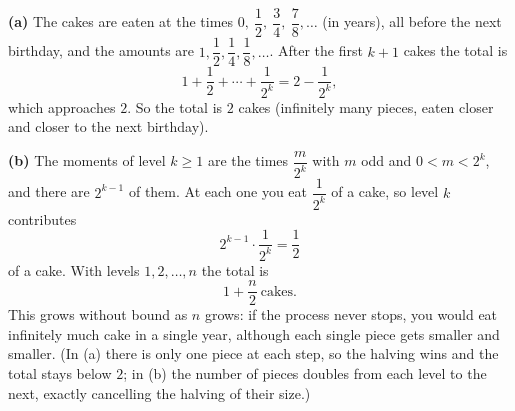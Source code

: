 \textbf{(a)} The cakes are eaten at the times $0,\ \dfrac{1}{2},\ \dfrac{3}{4},\ \dfrac{7}{8},\ldots$ (in years), all before the next birthday, and the amounts are $1,\dfrac{1}{2},\dfrac{1}{4},\dfrac{1}{8},\ldots$. After the first $k+1$ cakes the total is
\[1+\dfrac{1}{2}+\cdots+\dfrac{1}{2^k}=2-\dfrac{1}{2^k},\]
which approaches $2$. So the total is $\boxed{2}$ cakes (infinitely many pieces, eaten closer and closer to the next birthday).

\textbf{(b)} The moments of level $k\ge1$ are the times $\dfrac{m}{2^k}$ with $m$ odd and $0<m<2^k$, and there are $2^{k-1}$ of them. At each one you eat $\dfrac{1}{2^k}$ of a cake, so level $k$ contributes
\[2^{k-1}\cdot\dfrac{1}{2^k}=\dfrac{1}{2}\]
of a cake. With levels $1,2,\ldots,n$ the total is
\[\boxed{1+\dfrac {n}{2}}\ \text{cakes}.\]
This grows without bound as $n$ grows: if the process never stops, you would eat infinitely much cake in a single year, although each single piece gets smaller and smaller. (In (a) there is only one piece at each step, so the halving wins and the total stays below $2$; in (b) the number of pieces doubles from each level to the next, exactly cancelling the halving of their size.)
